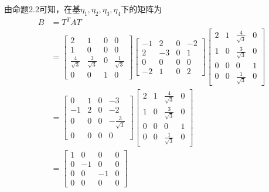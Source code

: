 \documentclass{article}
\begin{document}
\begin{itemize}
        由命题2.2可知，在基$\eta_1, \eta_2, \eta_3, \eta_4$下的矩阵为
        \begin{align*}
          B & = T^T A T                                \\
            & =
          \begin{bmatrix}
            2                  & 1                  & 0 & 0                  \\
            1                  & 0                  & 0 & 0                  \\
            \frac{4}{\sqrt{3}} & \frac{3}{\sqrt{3}} & 0 & \frac{1}{\sqrt{3}} \\
            0                  & 0                  & 1 & 0
          \end{bmatrix}
          \begin{bmatrix}
            -1 & 2  & 0 & -2 \\
            2  & -3 & 0 & 1  \\
            0  & 0  & 0 & 0  \\
            -2 & 1  & 0 & 2
          \end{bmatrix}
          \begin{bmatrix}
            2 & 1 & \frac{4}{\sqrt{3}} & 0 \\
            1 & 0 & \frac{3}{\sqrt{3}} & 0 \\
            0 & 0 & 0                  & 1 \\
            0 & 0 & \frac{1}{\sqrt{3}} & 0
          \end{bmatrix} \\
            & =
          \begin{bmatrix}
            0  & 1 & 0 & -3                   \\
            -1 & 2 & 0 & -2                   \\
            0  & 0 & 0 & - \frac{3}{\sqrt{3}} \\
            0  & 0 & 0 & 0
          \end{bmatrix}
          \begin{bmatrix}
            2 & 1 & \frac{4}{\sqrt{3}} & 0 \\
            1 & 0 & \frac{3}{\sqrt{3}} & 0 \\
            0 & 0 & 0                  & 1 \\
            0 & 0 & \frac{1}{\sqrt{3}} & 0
          \end{bmatrix} \\
            & =
          \begin{bmatrix}
            1 & 0  & 0  & 0 \\
            0 & -1 & 0  & 0 \\
            0 & 0  & -1 & 0 \\
            0 & 0  & 0  & 0
          \end{bmatrix}
        \end{align*}


\end{itemize}
\end{document}
